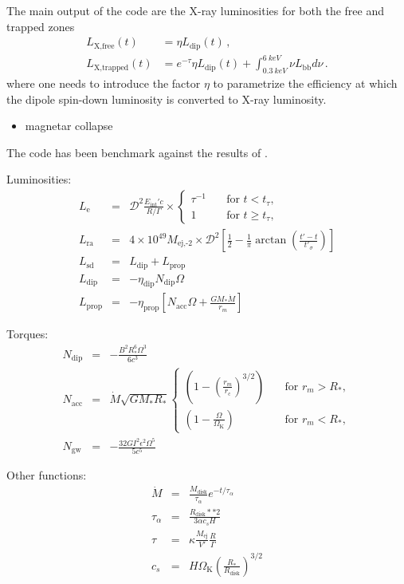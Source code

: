 \documentclass[11pt]{article} %
\newcommand{\tx}[1]{\textrm{#1}}
\newcommand{\Ldip}{\ensuremath{L_\tx{dip}}}
\newcommand{\Lbb}{\ensuremath{L_\tx{bb}}}
\begin{document}
The main output of the code are the X-ray luminosities for both the
free and trapped zones
\begin{align}
  L_\tx{X,free}(t) &= \eta \Ldip(t) \,,\\
  L_\tx{X,trapped}(t) &= e^{-\tau} \eta \Ldip(t)
  + \int_{\SI{0.3}{keV}}^{\SI{6}{keV}} \nu \Lbb d \nu
  \,.
\end{align}
where one needs to introduce the factor $\eta$ to parametrize the
efficiency at which the dipole spin-down luminosity is converted to
X-ray luminosity.

\begin{itemize}
\item magnetar collapse
\end{itemize}

The code has been benchmark against the results of
\citet{gompertz2014}.

Luminosities:
\begin{eqnarray}
L_\tx{e}		&=& \mathcal{D}^2\frac{E_\tx{int}'c}{R/\Gamma}\times
                                   \left\{\begin{array}{ll} 
                                   \tau^{-1}&\quad\tx{for\ }t<t_\tau, \\
                                  1 &\quad\tx{for\ }t\geq t_\tau,  \end{array}\right. \\
L_\tx{ra}		&=& 4\times10^{49}M_\tx{ej,-2}\times
                                  \mathcal{D}^2\left[\frac{1}{2}-\frac{1}{\pi}\arctan\left(\frac{t'-t}{t'_\sigma}\right)\right] \\
L_\tx{sd}		&=& L_\tx{dip}+L_\tx{prop} \\
L_\tx{dip}		&=& -\eta_\tx{dip} N_\tx{dip} \Omega \\
L_\tx{prop}	&=& -\eta_\tx{prop}[ N_\tx{acc} \Omega +\tfrac{GM_*\dot{M}}{r_m}]  
\end{eqnarray} 

Torques:
\begin{eqnarray}
N_\tx{dip}		&=& -\frac{B^2R_*^6\Omega^3}{6c^3} \\
N_\tx{acc}		&=& \dot{M}\sqrt{GM_*R_*}
				\left\{\begin{array}{ll} 
                                   \left(1-\left(\tfrac{r_m}{r_\tx{c}}\right)^{3/2}\right)&\quad\tx{for\ }r_m>R_*, \\
			        \left(1-\tfrac{\Omega}{\Omega_\tx{K}}\right)&\quad\tx{for\ }r_m<R_*,
			        \end{array}\right. \\
N_\tx{gw}		&=& -\frac{32GI^2\epsilon^2\Omega^5}{5c^5} 
\end{eqnarray}

Other functions:
\begin{eqnarray}
\dot{M}		&=& \frac{M_\tx{disk}}{\tau_\alpha}e^{-t/\tau_\alpha} \\
\tau_\alpha	&=& \frac{R_\tx{disk}**2}{3\alpha c_s H} \\
\tau			&=& \kappa\frac{M_\tx{ej}}{V'}\frac{R}{\Gamma} \\
c_s 			&=& H\Omega_\tx{K}\left(\tfrac{R_*}{R_\tx{disk}}\right)^{3/2}
\end{eqnarray} 



\end{document}
